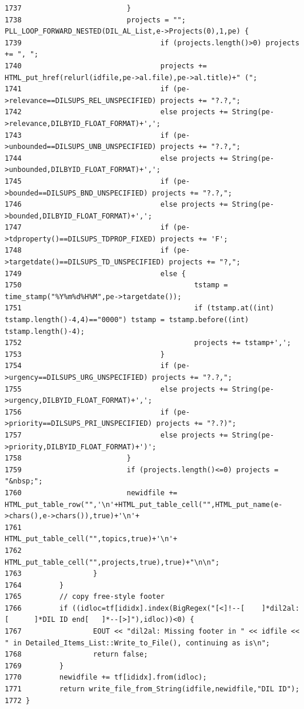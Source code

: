 \begin{verbatim}
1737                         }
1738                         projects = ""; PLL_LOOP_FORWARD_NESTED(DIL_AL_List,e->Projects(0),1,pe) {
1739                                 if (projects.length()>0) projects += ", ";
1740                                 projects += HTML_put_href(relurl(idfile,pe->al.file),pe->al.title)+" (";
1741                                 if (pe->relevance==DILSUPS_REL_UNSPECIFIED) projects += "?.?,";
1742                                 else projects += String(pe->relevance,DILBYID_FLOAT_FORMAT)+',';
1743                                 if (pe->unbounded==DILSUPS_UNB_UNSPECIFIED) projects += "?.?,";
1744                                 else projects += String(pe->unbounded,DILBYID_FLOAT_FORMAT)+',';
1745                                 if (pe->bounded==DILSUPS_BND_UNSPECIFIED) projects += "?.?,";
1746                                 else projects += String(pe->bounded,DILBYID_FLOAT_FORMAT)+',';
1747                                 if (pe->tdproperty()==DILSUPS_TDPROP_FIXED) projects += 'F';
1748                                 if (pe->targetdate()==DILSUPS_TD_UNSPECIFIED) projects += "?,";
1749                                 else {
1750                                         tstamp = time_stamp("%Y%m%d%H%M",pe->targetdate());
1751                                         if (tstamp.at((int) tstamp.length()-4,4)=="0000") tstamp = tstamp.before((int) tstamp.length()-4);
1752                                         projects += tstamp+',';
1753                                 }
1754                                 if (pe->urgency==DILSUPS_URG_UNSPECIFIED) projects += "?.?,";
1755                                 else projects += String(pe->urgency,DILBYID_FLOAT_FORMAT)+',';
1756                                 if (pe->priority==DILSUPS_PRI_UNSPECIFIED) projects += "?.?)";
1757                                 else projects += String(pe->priority,DILBYID_FLOAT_FORMAT)+')';
1758                         }
1759                         if (projects.length()<=0) projects = "&nbsp;";
1760                         newidfile += HTML_put_table_row("",'\n'+HTML_put_table_cell("",HTML_put_name(e->chars(),e->chars()),true)+'\n'+
1761                                                                                 HTML_put_table_cell("",topics,true)+'\n'+
1762                                                                                 HTML_put_table_cell("",projects,true),true)+"\n\n";
1763                 }
1764         }
1765         // copy free-style footer
1766         if ((idloc=tf[ididx].index(BigRegex("[<]!--[    ]*dil2al:[      ]*DIL ID end[   ]*--[>]"),idloc))<0) {
1767                 EOUT << "dil2al: Missing footer in " << idfile << " in Detailed_Items_List::Write_to_File(), continuing as is\n";
1768                 return false;
1769         }
1770         newidfile += tf[ididx].from(idloc);
1771         return write_file_from_String(idfile,newidfile,"DIL ID");
1772 }
\end{verbatim}\normalsize 
{}
